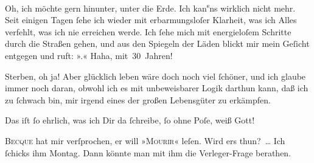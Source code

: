 \pstart
            Oh, ich möchte gern  hinunter, unter die Erde. Ich kan\substVorne{}\textsuperscript{s}\substDazwischen{}ns\substHinten{} wirklich nicht mehr. Seit einigen Tagen ſehe ich wieder mit erbarmungsloſer
               Klarheit, was ich Alles verfehlt, was {\pb}ich nie
               erreichen werde. Ich ſehe mich mit energieloſem Schritte durch die Straßen gehen, und
               aus den Spiegeln der Läden blickt mir mein Geſicht entgegen und ruft: »\label{K_L02739-3v}\label{K_L02739-3}.« Haha, mit 30 Jahren!\pend
           
\pstart
           Sterben, oh ja! Aber glücklich leben wäre doch noch viel ſchöner, und {\pb}ich glaube immer noch daran, obwohl ich es mit
               unbeweisbarer Logik darthun kann, daß ich zu ſchwach bin, mir irgend eines der großen
               Lebensgüter zu erkämpfen.\pend
           
\pstart
           Das iſt ſo ehrlich, was ich Dir da ſchreibe, ſo ohne Poſe, weiß Gott!\pend
           
\pstart
           \textsc{Becque} hat mir verſprochen, er will »\textsc{Mourir}« leſen. Wird ers thun? {\dots} Ich {\pb}ſchicks ihm Montag.
               Dann könnte man mit ihm die Verleger-Frage berathen.\pend
           
